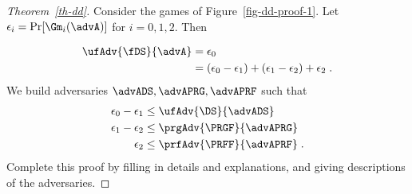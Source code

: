 \begin{proof}[Theorem~\ref{th-dd}] Consider the games of Figure~\ref{fig-dd-proof-1}. Let $\epsilon_i = \Pr[\Gm_i(\advA)]$ for $i=0,1,2$. Then

\begin{align}
	\ufAdv{\fDS}{\advA} & =  \epsilon_0 \nonumber \\
	& =  (\epsilon_0-\epsilon_1)+(\epsilon_1-\epsilon_2)+\epsilon_2 \nonumber \;.
\end{align}
We build adversaries $\advADS,\advAPRG,\advAPRF$ such that
\begin{align}
\epsilon_0-\epsilon_1 &
	\leq   \ufAdv{\DS}{\advADS} \\
	\epsilon_1-\epsilon_2 & \leq 
	 \prgAdv{\PRGF}{\advAPRG} \\
	\epsilon_2 & \leq  \prfAdv{\PRFF}{\advAPRF}\;.
\end{align}
Complete this proof by filling in details and explanations, and giving descriptions of the adversaries.
\end{proof}


